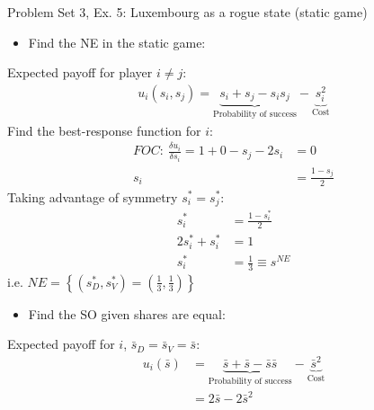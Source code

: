 \begin{frame}{Problem Set 3, Ex. 5: Luxembourg as a rogue state (static game)}
  \begin{multicols}{2}
    \begin{itemize}
      \item[(a)] Find the NE in the static game:
    \end{itemize}
    Expected payoff for player $i\neq j$:
    \begin{align*}
      u_i(s_i,s_j)=\underbrace{s_i+s_j-s_is_j}_\text{Probability of success}-\underbrace{s_i^2}_\text{Cost}
    \end{align*}
    Find the best-response function for $i$:
    \begin{align*}
      FOC:\ \frac{\delta u_i}{\delta s_i}=1+0-s_j-2s_i&=0\\
       s_i&=\frac{1-s_j}{2}
    \end{align*}
    Taking advantage of symmetry $s_i^{*}=s_j^{*}$:
    \begin{align*}
       s_i^{*}&=\frac{1-s_i^{*}}{2}\\
      2s_i^{*}+s_i^{*}&=1\\
       s_i^{*}&=\frac{1}{3}\equiv s^{NE}
    \end{align*}
    i.e. $NE=\left\{(s_D^{*},s_V^{*})=(\frac{1}{3},\frac{1}{3})\right\}$
  \vfill\null\columnbreak
    \begin{itemize}
      \item[(b)] Find the SO given shares are equal:
    \end{itemize}
    Expected payoff for $i$, $\bar{s}_D=\bar{s}_V=\bar{s}$:
    \begin{align*}
      u_i(\bar{s})&=\underbrace{\bar{s}+\bar{s}-\bar{s}\bar{s}}_\text{Probability of success}-\underbrace{\bar{s}^2}_\text{Cost}\\
                  &=2\bar{s}-2\bar{s}^2
    \end{align*}
  \vfill\null
  \end{multicols}
\end{frame}
